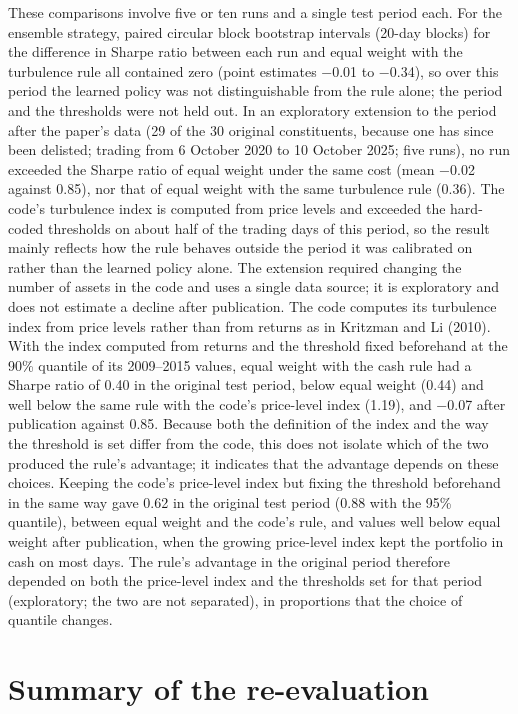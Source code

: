 \documentclass[12pt,a4paper]{report}
\begin{document}
These comparisons involve five or ten runs and a single test period
each. For the ensemble strategy, paired circular block bootstrap
intervals (20-day blocks) for the difference in Sharpe ratio between
each run and equal weight with the turbulence rule all contained zero
(point estimates −0.01 to −0.34), so over this period the learned policy
was not distinguishable from the rule alone; the period and the
thresholds were not held out. In an exploratory extension to the period
after the paper's data (29 of the 30 original constituents, because one
has since been delisted; trading from 6 October 2020 to 10 October 2025;
five runs), no run exceeded the Sharpe ratio of equal weight under the
same cost (mean −0.02 against 0.85), nor that of equal weight with the
same turbulence rule (0.36). The code's turbulence index is computed
from price levels and exceeded the hard-coded thresholds on about half
of the trading days of this period, so the result mainly reflects how
the rule behaves outside the period it was calibrated on rather than the
learned policy alone. The extension required changing the number of
assets in the code and uses a single data source; it is exploratory and
does not estimate a decline after publication. The code computes its
turbulence index from price levels rather than from returns as in
Kritzman and Li (2010). With the index computed from returns and the
threshold fixed beforehand at the 90\% quantile of its 2009--2015
values, equal weight with the cash rule had a Sharpe ratio of 0.40 in
the original test period, below equal weight (0.44) and well below the
same rule with the code's price-level index (1.19), and −0.07 after
publication against 0.85. Because both the definition of the index and
the way the threshold is set differ from the code, this does not isolate
which of the two produced the rule's advantage; it indicates that the
advantage depends on these choices. Keeping the code's price-level index
but fixing the threshold beforehand in the same way gave 0.62 in the
original test period (0.88 with the 95\% quantile), between equal weight
and the code's rule, and values well below equal weight after
publication, when the growing price-level index kept the portfolio in
cash on most days. The rule's advantage in the original period therefore
depended on both the price-level index and the thresholds set for that
period (exploratory; the two are not separated), in proportions that the
choice of quantile changes.

\section{Summary of the
re-evaluation}\label{summary-of-the-re-evaluation}
\end{document}
